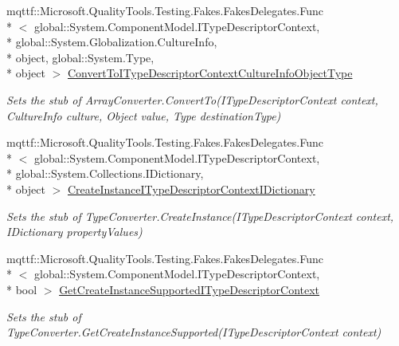 \begin{DoxyCompactItemize}
mqttf\-::\-Microsoft.\-Quality\-Tools.\-Testing.\-Fakes.\-Fakes\-Delegates.\-Func\\*
$<$ global\-::\-System.\-Component\-Model.\-I\-Type\-Descriptor\-Context, \\*
global\-::\-System.\-Globalization.\-Culture\-Info, \\*
object, global\-::\-System.\-Type, \\*
object $>$ \hyperlink{class_system_1_1_component_model_1_1_fakes_1_1_stub_array_converter_aaff068a64544347b5e2d2348575c9281}{Convert\-To\-I\-Type\-Descriptor\-Context\-Culture\-Info\-Object\-Type}
\begin{DoxyCompactList}\small\item\em Sets the stub of Array\-Converter.\-Convert\-To(\-I\-Type\-Descriptor\-Context context, Culture\-Info culture, Object value, Type destination\-Type)\end{DoxyCompactList}\item 
mqttf\-::\-Microsoft.\-Quality\-Tools.\-Testing.\-Fakes.\-Fakes\-Delegates.\-Func\\*
$<$ global\-::\-System.\-Component\-Model.\-I\-Type\-Descriptor\-Context, \\*
global\-::\-System.\-Collections.\-I\-Dictionary, \\*
object $>$ \hyperlink{class_system_1_1_component_model_1_1_fakes_1_1_stub_array_converter_ab632777875a35e4007b687c2091d2fce}{Create\-Instance\-I\-Type\-Descriptor\-Context\-I\-Dictionary}
\begin{DoxyCompactList}\small\item\em Sets the stub of Type\-Converter.\-Create\-Instance(\-I\-Type\-Descriptor\-Context context, I\-Dictionary property\-Values)\end{DoxyCompactList}\item 
mqttf\-::\-Microsoft.\-Quality\-Tools.\-Testing.\-Fakes.\-Fakes\-Delegates.\-Func\\*
$<$ global\-::\-System.\-Component\-Model.\-I\-Type\-Descriptor\-Context, \\*
bool $>$ \hyperlink{class_system_1_1_component_model_1_1_fakes_1_1_stub_array_converter_a1c86f6eed73e680b941c3dc9cdc1c964}{Get\-Create\-Instance\-Supported\-I\-Type\-Descriptor\-Context}
\begin{DoxyCompactList}\small\item\em Sets the stub of Type\-Converter.\-Get\-Create\-Instance\-Supported(\-I\-Type\-Descriptor\-Context context)\end{DoxyCompactList}\item 

\end{DoxyCompactItemize}
